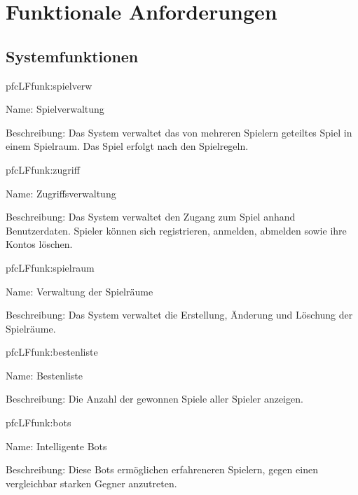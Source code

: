 \chapter{Funktionale Anforderungen}


\section{Systemfunktionen}

\setcounter{pfc}{10}

\begin{description}[leftmargin=5em, style=sameline]
	
	\begin{lhp}{pfc}{LF}{funk:spielverw}
		\item [Name:] Spielverwaltung
		\item [Beschreibung:] Das System verwaltet das von mehreren Spielern geteiltes Spiel in einem Spielraum. Das Spiel erfolgt nach den Spielregeln.
	\end{lhp}
	
	\begin{lhp}{pfc}{LF}{funk:zugriff}
		\item [Name:] Zugriffsverwaltung
		\item [Beschreibung:] Das System verwaltet den Zugang zum Spiel anhand Benutzerdaten. Spieler können sich registrieren, anmelden, abmelden sowie ihre Kontos löschen.
	\end{lhp}

	\begin{lhp}{pfc}{LF}{funk:spielraum}
		\item [Name:] Verwaltung der Spielräume
		\item [Beschreibung:] Das System verwaltet die Erstellung, Änderung und Löschung der Spielräume.
	\end{lhp}
	
	\begin{lhp}{pfc}{LF}{funk:bestenliste}
		\item [Name:] Bestenliste
		\item [Beschreibung:] Die Anzahl der gewonnen Spiele aller Spieler anzeigen.
	\end{lhp}
	
	\begin{lhp}{pfc}{LF}{funk:bots}
		\item [Name:] Intelligente Bots
		\item [Beschreibung:] Diese Bots ermöglichen erfahreneren Spielern, gegen einen vergleichbar starken Gegner anzutreten.
	\end{lhp}
	

\end{description}
